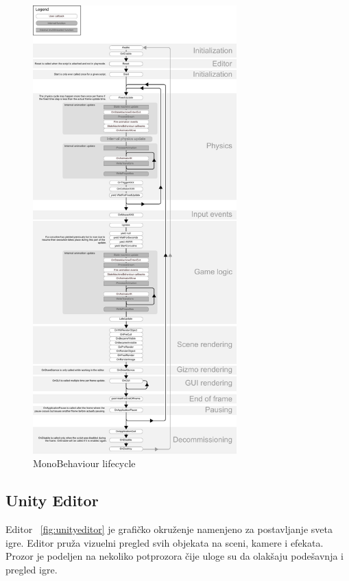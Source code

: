 \begin{center}
    \begin{figure}
        \includegraphics[width=0.7\textwidth]{Figures/mono_flowchart.pdf}
        \caption{MonoBehaviour lifecycle}
        \label{fig:monoflowchart}
    \end{figure}
\end{center}

\subsection{Unity Editor}

Editor ~\ref{fig:unityeditor} je grafi\v{c}ko okru\v{z}enje namenjeno za postavljanje sveta igre. Editor
pru\v{z}a vizuelni pregled svih objekata na sceni, kamere i efekata. Prozor je podeljen
na nekoliko potprozora \v{c}ije uloge su da olak\v{s}aju pode\v{s}avnja i pregled igre.

